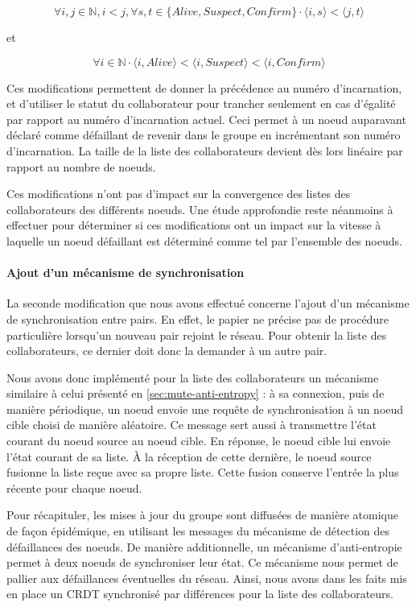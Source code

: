 \documentclass[12pt]{thesul}
\newcommand{\trm}[1]{\mathit{#1}}
\begin{document}
\[\forall i,j \in \mathbb{N}, i < j, \forall s,t \in \{\trm{Alive}, \trm{Suspect}, \trm{Confirm}\} \cdot \langle i,s \rangle < \langle j,t \rangle\]

et

\[\forall i \in \mathbb{N} \cdot \langle i,\trm{Alive} \rangle < \langle i,\trm{Suspect} \rangle < \langle i,\trm{Confirm} \rangle\]

Ces modifications permettent de donner la précédence au numéro d'incarnation, et d'utiliser le statut du collaborateur pour trancher seulement en cas d'égalité par rapport au numéro d'incarnation actuel.
Ceci permet à un noeud auparavant déclaré comme défaillant de revenir dans le groupe en incrémentant son numéro d'incarnation.
La taille de la liste des collaborateurs devient dès lors linéaire par rapport au nombre de noeuds.

Ces modifications n'ont pas d'impact sur la convergence des listes des collaborateurs des différents noeuds.
Une étude approfondie reste néanmoins à effectuer pour déterminer si ces modifications ont un impact sur la vitesse à laquelle un noeud défaillant est déterminé comme tel par l'ensemble des noeuds.

\paragraph{Ajout d'un mécanisme de synchronisation}

La seconde modification que nous avons effectué concerne l'ajout d'un mécanisme de synchronisation entre pairs.
En effet, le papier ne précise pas de procédure particulière lorsqu'un nouveau pair rejoint le réseau.
Pour obtenir la liste des collaborateurs, ce dernier doit donc la demander à un autre pair.

Nous avons donc implémenté pour la liste des collaborateurs un mécanisme similaire à celui présenté en \autoref{sec:mute-anti-entropy} : à sa connexion, puis de manière périodique, un noeud envoie une requête de synchronisation à un noeud cible choisi de manière aléatoire.
Ce message sert aussi à transmettre l'état courant du noeud source au noeud cible.
En réponse, le noeud cible lui envoie l'état courant de sa liste.
À la réception de cette dernière, le noeud source fusionne la liste reçue avec sa propre liste.
Cette fusion conserve l'entrée la plus récente pour chaque noeud.

Pour récapituler, les mises à jour du groupe sont diffusées de manière atomique de façon épidémique, en utilisant les messages du mécanisme de détection des défaillances des noeuds.
De manière additionnelle, un mécanisme d'anti-entropie permet à deux noeuds de synchroniser leur état.
Ce mécanisme nous permet de pallier aux défaillances éventuelles du réseau.
Ainsi, nous avons dans les faits mis en place un \ac{CRDT} synchronisé par différences pour la liste des collaborateurs.
\end{document}
